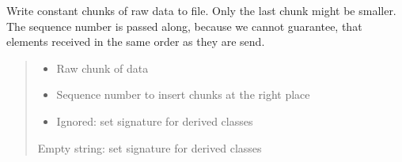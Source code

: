 \documentclass[letterpaper,10pt,english]{sphinxmanual}
\begin{document}
\begin{savenotes}
\begin{fulllineitems}
\begin{savenotes}\begin{fulllineitems}
\label{\detokenize{eezz:eezz.filesrv.TFile.write}}
\pysigstartsignatures
{}
\pysigstopsignatures
\sphinxAtStartPar
Write constant chunks of raw data to file. Only the last chunk might be smaller.
The sequence number is passed along, because we cannot guarantee, that elements received in the same
order as they are send.
\begin{quote}\begin{description}
\begin{itemize}
\item {} 
\sphinxAtStartPar
{} \textendash{} Raw chunk of data

\item {} 
\sphinxAtStartPar
{} \textendash{} Sequence number to insert chunks at the right place

\item {} 
\sphinxAtStartPar
{} \textendash{} Ignored:   set signature for derived classes

\end{itemize}

\sphinxAtStartPar
Empty string:  set signature for derived classes

\end{description}\end{quote}

\end{fulllineitems}\end{savenotes}


\end{fulllineitems}\end{savenotes}
\end{document}

